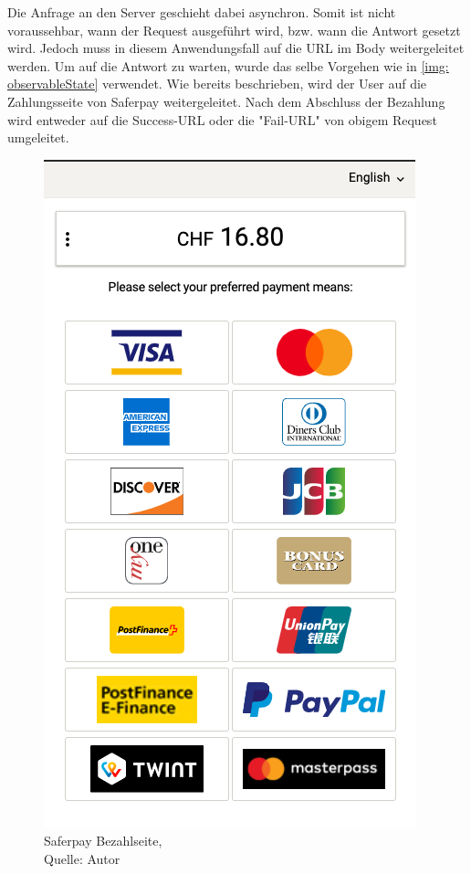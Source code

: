Die Anfrage an den Server geschieht dabei asynchron. Somit ist nicht voraussehbar, wann der Request ausgeführt wird, bzw. wann die Antwort gesetzt wird. Jedoch muss in diesem Anwendungsfall auf die URL im Body weitergeleitet werden. Um auf die Antwort zu warten, wurde das selbe Vorgehen wie in \ref{img: observableState} verwendet. 
Wie bereits beschrieben, wird der User auf die Zahlungsseite von Saferpay weitergeleitet. Nach dem Abschluss der Bezahlung wird entweder auf die Success-URL oder die "Fail-URL" von obigem Request umgeleitet. 
\begin{figure}[H]
	\centering
	\includegraphics[scale=0.5]{images/paymentSaferpay.PNG}
	\caption[Saferpay Bezahlseite]{Saferpay Bezahlseite,\\ Quelle: Autor}
	\label{img: paymentSaferpay}
\end{figure} 

